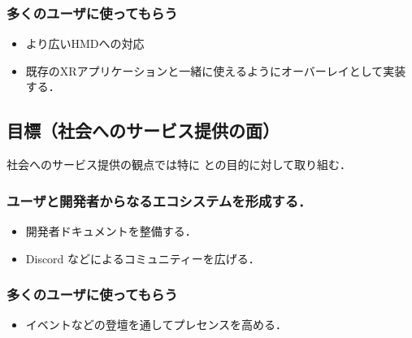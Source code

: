 \subsubsection*{多くのユーザに使ってもらう}

\begin{itemize}
  \item より広いHMDへの対応
  \item 既存のXRアプリケーションと一緒に使えるようにオーバーレイとして実装する．
\end{itemize}

\subsection{目標（社会へのサービス提供の面）}

社会へのサービス提供の観点では特に
との目的に対して取り組む．

\subsubsection{ユーザと開発者からなるエコシステムを形成する．}

\begin{itemize}
  \item 開発者ドキュメントを整備する．
  \item Discord などによるコミュニティーを広げる． %
\end{itemize}

\subsubsection{多くのユーザに使ってもらう}

\begin{itemize}
  \item イベントなどの登壇を通してプレセンスを高める．%
\end{itemize}

